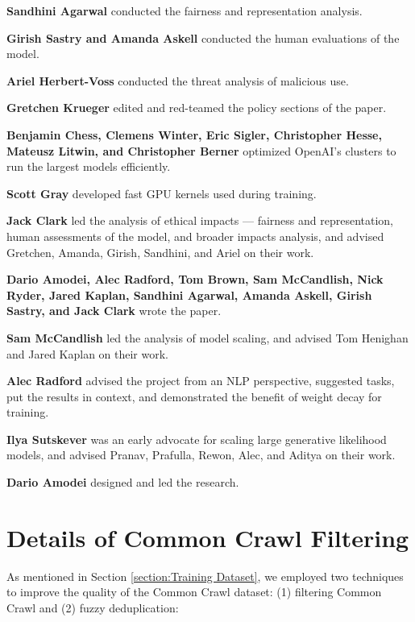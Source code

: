 \documentclass{article}
\begin{document}
\textbf{Sandhini Agarwal} conducted the fairness and representation analysis.

\textbf{Girish Sastry and Amanda Askell} conducted the human evaluations of the model.

\textbf{Ariel Herbert-Voss} conducted the threat analysis of malicious use.

\textbf{Gretchen Krueger} edited and red-teamed the policy sections of the paper.

\textbf{Benjamin Chess, Clemens Winter, Eric Sigler, Christopher Hesse, Mateusz Litwin, and Christopher Berner} optimized OpenAI’s clusters to run the largest models efficiently.

\textbf{Scott Gray} developed fast GPU kernels used during training.

\textbf{Jack Clark} led the analysis of ethical impacts — fairness and representation, human assessments of the model, and broader impacts analysis, and advised Gretchen, Amanda, Girish, Sandhini, and Ariel on their work.

\textbf{Dario Amodei, Alec Radford, Tom Brown, Sam McCandlish, Nick Ryder, Jared Kaplan, Sandhini Agarwal, Amanda Askell, Girish Sastry, and Jack Clark} wrote the paper.

\textbf{Sam McCandlish} led the analysis of model scaling, and advised Tom Henighan and Jared Kaplan on their work.

\textbf{Alec Radford} advised the project from an NLP perspective, suggested tasks, put the results in context, and demonstrated the benefit of weight decay for training.

\textbf{Ilya Sutskever} was an early advocate for scaling large generative likelihood models, and advised Pranav, Prafulla, Rewon, Alec, and Aditya on their work.

\textbf{Dario Amodei} designed and led the research.
 
\appendix
\clearpage
\newpage
\section{Details of Common Crawl Filtering}
\label{appendix:common_crawl_filtering}
As mentioned in Section \ref{section:Training Dataset}, we employed two techniques to improve the quality of the Common Crawl dataset: (1) filtering Common Crawl and (2) fuzzy deduplication:
\end{document}

